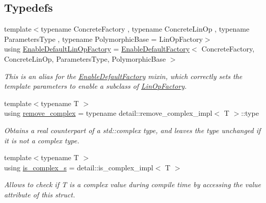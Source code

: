 \subsection*{Typedefs}
\begin{DoxyCompactItemize}
\item 
{\footnotesize template$<$typename Concrete\+Factory , typename Concrete\+Lin\+Op , typename Parameters\+Type , typename Polymorphic\+Base  = Lin\+Op\+Factory$>$ }\\using \hyperlink{group__LinOp_ga24628d477cba68b31cea690572c51912}{Enable\+Default\+Lin\+Op\+Factory} = \hyperlink{classgko_1_1EnableDefaultFactory}{Enable\+Default\+Factory}$<$ Concrete\+Factory, Concrete\+Lin\+Op, Parameters\+Type, Polymorphic\+Base $>$
\begin{DoxyCompactList}\small\item\em This is an alias for the \hyperlink{classgko_1_1EnableDefaultFactory}{Enable\+Default\+Factory} mixin, which correctly sets the template parameters to enable a subclass of \hyperlink{classgko_1_1LinOpFactory}{Lin\+Op\+Factory}. \end{DoxyCompactList}\item 
\mbox{\label{namespacegko_adfcb75c44f6b6c701989419c166f6e7e}} 
{\footnotesize template$<$typename T $>$ }\\using \hyperlink{namespacegko_adfcb75c44f6b6c701989419c166f6e7e}{remove\+\_\+complex} = typename detail\+::remove\+\_\+complex\+\_\+impl$<$ T $>$\+::type
\begin{DoxyCompactList}\small\item\em Obtains a real counterpart of a std\+::complex type, and leaves the type unchanged if it is not a complex type. \end{DoxyCompactList}\item 
{\footnotesize template$<$typename T $>$ }\\using \hyperlink{namespacegko_aeede19206954d5c8ebd04c95cf63bb88}{is\+\_\+complex\+\_\+s} = detail\+::is\+\_\+complex\+\_\+impl$<$ T $>$
\begin{DoxyCompactList}\small\item\em Allows to check if T is a complex value during compile time by accessing the {\ttfamily value} attribute of this struct. \end{DoxyCompactList}\item 
\mbox{\label{namespacegko_ab5d71c1f4bd1b654df1e561ea7a811f2}} 

\end{DoxyCompactItemize}
